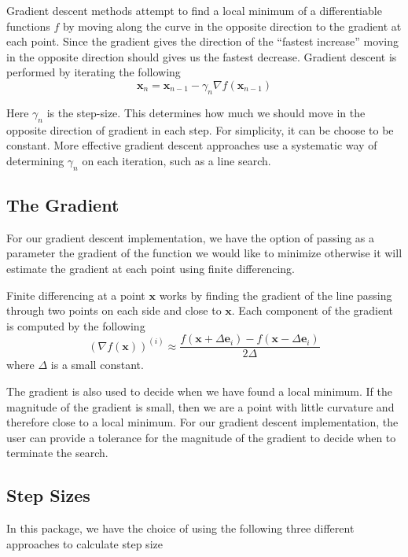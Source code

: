 \documentclass[12pt,]{article}
\begin{document}
Gradient descent methods attempt to find a local minimum of a
differentiable functions \(f\) by moving along the curve in the opposite
direction to the gradient at each point. Since the gradient gives the
direction of the ``fastest increase'' moving in the opposite direction
should gives us the fastest decrease. Gradient descent is performed by
iterating the following \[
    \mathbf{x}_n = \mathbf{x}_{n-1} - \gamma_n \nabla f(\mathbf{x}_{n-1})
\]

Here \(\gamma_n\) is the step-size. This determines how much we should
move in the opposite direction of gradient in each step. For simplicity,
it can be choose to be constant. More effective gradient descent
approaches use a systematic way of determining \(\gamma_n\) on each
iteration, such as a line search.

\hypertarget{the-gradient}{%
\subsection{The Gradient}\label{the-gradient}}

For our gradient descent implementation, we have the option of passing
as a parameter the gradient of the function we would like to minimize
otherwise it will estimate the gradient at each point using finite
differencing.

Finite differencing at a point \(\mathbf{x}\) works by finding the
gradient of the line passing through two points on each side and close
to \(\mathbf{x}\). Each component of the gradient is computed by the
following \[
(\nabla f (\mathbf{x}))^{(i)} \approx \frac{f(\mathbf{x} + \Delta \mathbf{e}_i) - f(\mathbf{x} - \Delta \mathbf{e}_i)}{2\Delta}
\] where \(\Delta\) is a small constant.

The gradient is also used to decide when we have found a local minimum.
If the magnitude of the gradient is small, then we are a point with
little curvature and therefore close to a local minimum. For our
gradient descent implementation, the user can provide a tolerance for
the magnitude of the gradient to decide when to terminate the search.

\hypertarget{step-sizes}{%
\subsection{Step Sizes}\label{step-sizes}}

In this package, we have the choice of using the following three
different approaches to calculate step size
\end{document}
